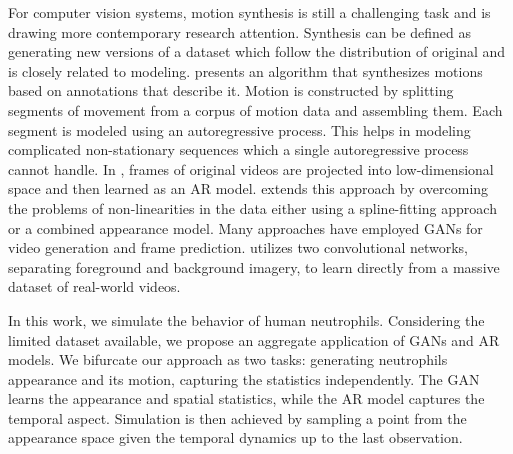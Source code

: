 \documentclass{article}
\begin{document}
For computer vision systems, motion synthesis is still a challenging task and is drawing more contemporary research attention. Synthesis can be defined as generating new versions of a dataset which follow the distribution of original and is closely related to modeling. \cite{motionfromannotations} presents an algorithm that synthesizes motions based on annotations that describe it. Motion is constructed by splitting segments of movement from a corpus of motion data and assembling them. Each segment is modeled using an autoregressive process. This helps in modeling complicated non-stationary sequences which a single autoregressive process cannot handle. In \cite{armotionsynthesis}, frames of original videos are projected into low-dimensional space and then learned as an AR model. \cite{ad04bba6acd84038b8d6e913b5669b55} extends this approach by overcoming the problems of non-linearities in the data either using a spline-fitting approach or a combined appearance model. Many approaches have employed GANs for video generation and frame prediction. \cite{DBLP:journals/corr/VillegasYHLL17} utilizes two convolutional networks, separating foreground and background imagery, to learn directly from a massive dataset of real-world videos. \par
In this work, we simulate the behavior of human neutrophils. Considering the limited dataset available, we propose an aggregate application of GANs and AR models. We bifurcate our approach as two tasks: generating neutrophil\textquotesingle s appearance and its motion, capturing the statistics independently. The GAN learns the appearance and spatial statistics, while the AR model captures the temporal aspect. Simulation is then achieved by sampling a point from the appearance space given the temporal dynamics up to the last observation. \par
\vspace{-0.58cm}
\end{document}

